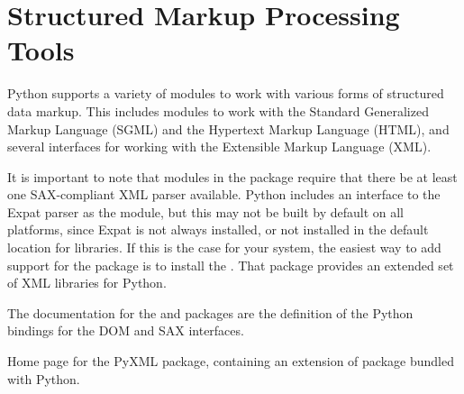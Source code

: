 \chapter{Structured Markup Processing Tools
         \label{markup}}

Python supports a variety of modules to work with various forms of
structured data markup.  This includes modules to work with the
Standard Generalized Markup Language (SGML) and the Hypertext Markup
Language (HTML), and several interfaces for working with the
Extensible Markup Language (XML).

It is important to note that modules in the  package
require that there be at least one SAX-compliant XML parser
available.  Python includes an interface to the Expat parser as the
 module, but this may not be built by
default on all platforms, since Expat is not always installed, or not
installed in the default location for libraries.  If this is the case
for your system, the easiest way to add support for the 
package is to install the .  That package provides an
extended set of XML libraries for Python.

The documentation for the  and 
packages are the definition of the Python bindings for the DOM and SAX
interfaces.

\localmoduletable

\begin{seealso}
           {Home page for the PyXML package, containing an extension
            of  package bundled with Python.}
\end{seealso}
